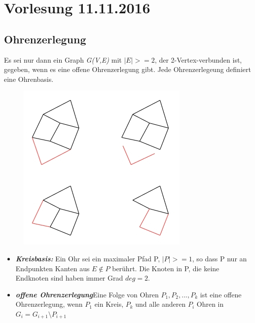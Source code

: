 \section{Vorlesung 11.11.2016}
\subsection{Ohrenzerlegung}

Es sei nur dann ein Graph \textit{G(V,E)} mit $|E|>=2$, der 2-Vertex-verbunden ist, gegeben, wenn es eine offene Ohrenzerlegung gibt. Jede Ohrenzerlegeung definiert eine Ohrenbasis.

\begin{figure}[htp]
\centering
\includegraphics[scale=1.00]{lectures/161111/pix/pic1.jpg}
\end{figure}

\begin{itemize}
	\item \textbf{\textit{Kreisbasis:}} \newline Ein Ohr sei ein maximaler Pfad P, $|P| >= 1$, so dass P nur an Endpunkten Kanten aus $E\notin P$ berührt. Die Knoten in P, die keine Endknoten sind haben immer Grad $deg = 2$.
	\item \textbf{\textit{offene Ohrenzerlegung}}\newline Eine Folge von Ohren $P_1, P_2, ..., P_k$ ist eine offene Ohrenzerlegung, wenn $P_1$ ein Kreis, $P_k$ und alle anderen $P_i$ Ohren in $G_i = G_{i+1} \setminus P_{i+1}$
\end{itemize}

\newpage
